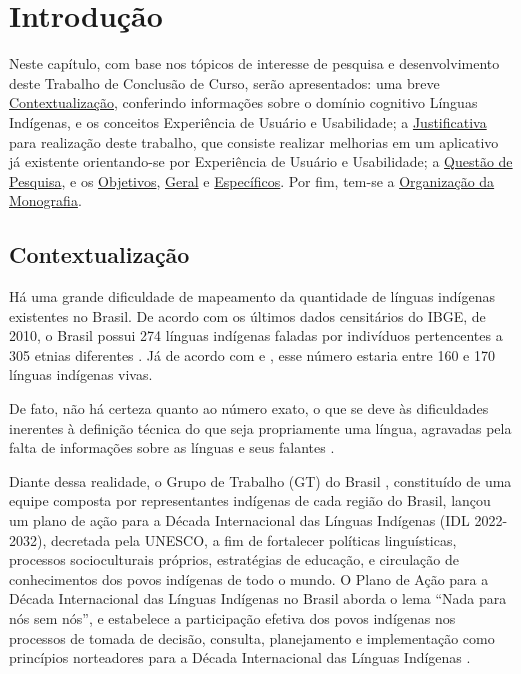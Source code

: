 \chapter[Introdução]{Introdução}
\label{chap:Introducao}

Neste capítulo, com base nos tópicos de interesse de pesquisa e desenvolvimento deste Trabalho de Conclusão de Curso, serão apresentados: uma breve
\hyperref[sec:Contextualização]{Contextualização}, conferindo informações sobre o domínio cognitivo Línguas Indígenas, e os conceitos Experiência de Usuário e
Usabilidade; a \hyperref[sec:Justificativa]{Justificativa} para realização deste trabalho, que consiste realizar melhorias em um aplicativo já existente orientando-se por
Experiência de Usuário e Usabilidade; a \hyperref[sec:QuestaodePesquisa]{Questão de Pesquisa}, e os \hyperref[sec:Objetivos]{Objetivos},
\hyperref[sec:ObjetivoGeral]{Geral} e \hyperref[sec:ObjetivosEspecificos]{Específicos}. Por fim, tem-se a \hyperref[sec:OrganizacaodaMonografia]{Organização da Monografia}.

\section{Contextualização}
\label{sec:Contextualização}

Há uma grande dificuldade de mapeamento da quantidade de línguas indígenas existentes no Brasil. De acordo com os últimos dados censitários do IBGE, de 2010, o Brasil
possui 274 línguas indígenas faladas por indivíduos pertencentes a 305 etnias diferentes \cite{ibge}. Já de acordo com  e , esse
número estaria entre 160 e 170 línguas indígenas vivas.

De fato, não há certeza quanto ao número exato, o que se deve às dificuldades inerentes à definição técnica do que seja propriamente uma língua, agravadas pela falta de
informações sobre as línguas e seus falantes \cite{seki2000}.

Diante dessa realidade, o Grupo de Trabalho (GT) do Brasil \cite{gtbrasil2021}, constituído de uma equipe composta por representantes indígenas de cada região do Brasil,
lançou um plano de ação para a Década Internacional das Línguas Indígenas (IDL 2022-2032), decretada pela UNESCO, a fim de fortalecer políticas linguísticas, processos
socioculturais próprios, estratégias de educação, e circulação de conhecimentos dos povos indígenas de todo o mundo. O Plano de Ação para a Década Internacional das
Línguas Indígenas no Brasil aborda o lema “Nada para nós sem nós”, e estabelece a participação efetiva dos povos indígenas nos processos de tomada de decisão, consulta,
planejamento e implementação como princípios norteadores para a Década Internacional das Línguas Indígenas \cite{gtbrasil2021}.


